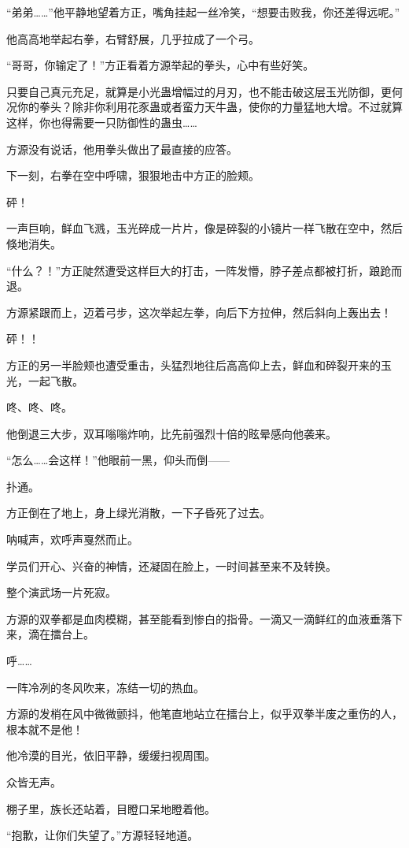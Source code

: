 \begin{this_body}
“弟弟……”他平静地望着方正，嘴角挂起一丝冷笑，“想要击败我，你还差得远呢。”

他高高地举起右拳，右臂舒展，几乎拉成了一个弓。

“哥哥，你输定了！”方正看着方源举起的拳头，心中有些好笑。

只要自己真元充足，就算是小光蛊增幅过的月刃，也不能击破这层玉光防御，更何况你的拳头？除非你利用花豕蛊或者蛮力天牛蛊，使你的力量猛地大增。不过就算这样，你也得需要一只防御性的蛊虫……

方源没有说话，他用拳头做出了最直接的应答。

下一刻，右拳在空中呼啸，狠狠地击中方正的脸颊。

砰！

一声巨响，鲜血飞溅，玉光碎成一片片，像是碎裂的小镜片一样飞散在空中，然后倏地消失。

“什么？！”方正陡然遭受这样巨大的打击，一阵发懵，脖子差点都被打折，踉跄而退。

方源紧跟而上，迈着弓步，这次举起左拳，向后下方拉伸，然后斜向上轰出去！

砰！！

方正的另一半脸颊也遭受重击，头猛烈地往后高高仰上去，鲜血和碎裂开来的玉光，一起飞散。

咚、咚、咚。

他倒退三大步，双耳嗡嗡炸响，比先前强烈十倍的眩晕感向他袭来。

“怎么……会这样！”他眼前一黑，仰头而倒——

扑通。

方正倒在了地上，身上绿光消散，一下子昏死了过去。

呐喊声，欢呼声戛然而止。

学员们开心、兴奋的神情，还凝固在脸上，一时间甚至来不及转换。

整个演武场一片死寂。

方源的双拳都是血肉模糊，甚至能看到惨白的指骨。一滴又一滴鲜红的血液垂落下来，滴在擂台上。

呼……

一阵冷冽的冬风吹来，冻结一切的热血。

方源的发梢在风中微微颤抖，他笔直地站立在擂台上，似乎双拳半废之重伤的人，根本就不是他！

他冷漠的目光，依旧平静，缓缓扫视周围。

众皆无声。

棚子里，族长还站着，目瞪口呆地瞪着他。

“抱歉，让你们失望了。”方源轻轻地道。

\end{this_body}


